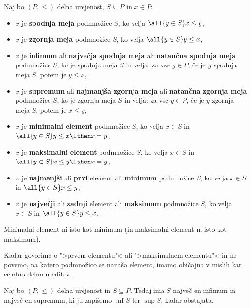 \begin{definicija}
  Naj bo $(P, {\leq})$ delna urejenost, $S \subseteq P$ in $x \in P$:
  \begin{itemize}

  \item $x$ je \textbf{spodnja meja} podmnožice $S$, ko velja $\all{y \in S} x \leq y$,

  \item $x$ je \textbf{zgornja meja} podmnožice $S$, ko velja $\all{y \in S} y \leq x$,

  \item $x$ je \textbf{infimum} ali \textbf{največja spodnja meja} ali \textbf{natančna spodnja meja} podmnožice $S$, ko je spodnja meja $S$ in velja: za vse $y \in P$, če je $y$ spodnja meja
    $S$, potem je $y \leq x$,

  \item $x$ je \textbf{supremum} ali \textbf{najmanjša zgornja meja} ali \textbf{natančna zgornja meja} podmnožice $S$, ko je zgornja meja $S$ in velja: za vse $y \in P$, če je $y$ zgornja meja $S$, potem je $x \leq y$,

  \item $x$ je \textbf{minimalni element} podmnožice $S$, ko velja $x \in S$ in $\all{y \in S} y \leq x \lthen x = y$,

  \item $x$ je \textbf{maksimalni element} podmnožice $S$, ko velja $x \in S$ in
      $\all{y \in S} x \leq y \lthen x = y$,

  \item $x$ je \textbf{najmanjši} ali \textbf{prvi} element ali \textbf{minimum} podmnožice $S$, ko velja $x \in S$ in $\all{y \in S} x \leq y$,

  \item $x$ je \textbf{največji} ali \textbf{zadnji} element ali \textbf{maksimum} podmnožice $S$, ko velja $x \in S$ in $\all{y \in S} y \leq x$.
\end{itemize}
\end{definicija}

\begin{opomba}
  Minimalni element ni isto kot minimum (in maksimalni element ni isto kot maksimum).
\end{opomba}

Kadar govorimo o ">prvem elementu"< ali ">maksimalnem elementu"< in ne povemo, na
katero podmnožico se nanaša element, imamo običajno v mislih kar celotno delno
ureditev.

\begin{izrek}
  Naj bo $(P, {\leq})$ delna urejenost in $S \subseteq P$. Tedaj ima $S$ največ en
  infimum in največ en supremum, ki ju zapišemo $\inf S$ ter $\sup S$, kadar obstajata.
\end{izrek}

